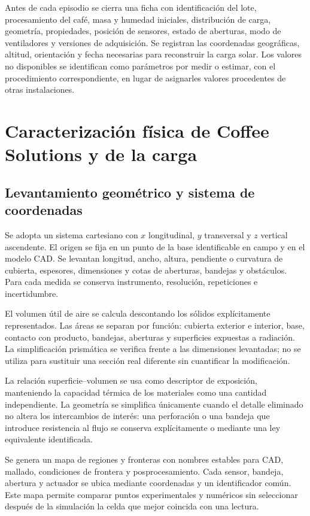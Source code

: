 Antes de cada episodio se cierra una ficha con identificación del lote, procesamiento del café, masa y humedad iniciales, distribución de carga, geometría, propiedades, posición de sensores, estado de aberturas, modo de ventiladores y versiones de adquisición. Se registran las coordenadas geográficas, altitud, orientación y fecha necesarias para reconstruir la carga solar. Los valores no disponibles se identifican como parámetros por medir o estimar, con el procedimiento correspondiente, en lugar de asignarles valores procedentes de otras instalaciones.

\section{Caracterización física de Coffee Solutions y de la carga}
\label{met:caracterizacion}

\subsection{Levantamiento geométrico y sistema de coordenadas}

Se adopta un sistema cartesiano con $x$ longitudinal, $y$ transversal y $z$ vertical ascendente. El origen se fija en un punto de la base identificable en campo y en el modelo CAD. Se levantan longitud, ancho, altura, pendiente o curvatura de cubierta, espesores, dimensiones y cotas de aberturas, bandejas y obstáculos. Para cada medida se conserva instrumento, resolución, repeticiones e incertidumbre.

El volumen útil de aire se calcula descontando los sólidos explícitamente representados. Las áreas se separan por función: cubierta exterior e interior, base, contacto con producto, bandejas, aberturas y superficies expuestas a radiación. La simplificación prismática se verifica frente a las dimensiones levantadas; no se utiliza para sustituir una sección real diferente sin cuantificar la modificación.

La relación superficie--volumen se usa como descriptor de exposición, manteniendo la capacidad térmica de los materiales como una cantidad independiente. La geometría se simplifica únicamente cuando el detalle eliminado no altera los intercambios de interés: una perforación o una bandeja que introduce resistencia al flujo se conserva explícitamente o mediante una ley equivalente identificada.

Se genera un mapa de regiones y fronteras con nombres estables para CAD, mallado, condiciones de frontera y posprocesamiento. Cada sensor, bandeja, abertura y actuador se ubica mediante coordenadas y un identificador común. Este mapa permite comparar puntos experimentales y numéricos sin seleccionar después de la simulación la celda que mejor coincida con una lectura.

